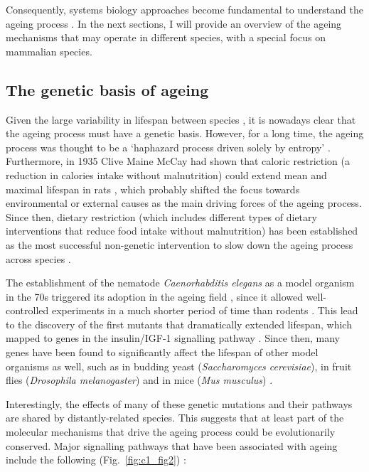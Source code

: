 Consequently, systems biology approaches become fundamental to understand the ageing process \citep{Freund2019}. In the next sections, I will provide an overview of the ageing mechanisms that may operate in different species, with a special focus on mammalian species. 

\smallskip

\subsection{The genetic basis of ageing} \label{s:1.1.2}

\smallskip

Given the large variability in lifespan between species \citep{Jones2013}, it is nowadays clear that the ageing process must have a genetic basis. However, for a long time, the ageing process was thought to be a `haphazard process driven solely by entropy' \citep{Kenyon2005}. Furthermore, in 1935 Clive Maine McCay had shown that caloric restriction (a reduction in calories intake without malnutrition) could extend mean and maximal lifespan in rats \citep{McCay1935,McDonald2010}, which probably shifted the focus towards environmental or external causes as the main driving forces of the ageing process. Since then, dietary restriction (which includes different types of dietary interventions that reduce food intake without malnutrition) has been established as the most successful non-genetic intervention to slow down the ageing process across species \citep{Fontana2015}.

\bigskip

The establishment of the nematode \textit{Caenorhabditis elegans} as a model organism in the 70s triggered its adoption in the ageing field \citep{KLASS1976}, since it allowed well-controlled experiments in a much shorter period of time than rodents \citep{Johnson2013}. This lead to the discovery of the first mutants that dramatically extended lifespan, which mapped to genes in the insulin/IGF-1 signalling pathway \citep{Kenyon1993,Morris1996}. Since then, many genes have been found to significantly affect the lifespan of other model organisms as well, such as in budding yeast (\textit{Saccharomyces cerevisiae}), in fruit flies (\textit{Drosophila melanogaster}) and in mice (\textit{Mus musculus}) \citep{Kenyon2005,Kenyon2010,Singh2019}. 

\bigskip

Interestingly, the effects of many of these genetic mutations and their pathways are shared by distantly-related species. This suggests that at least part of the molecular mechanisms that drive the ageing process could be evolutionarily conserved. Major signalling pathways that have been associated with ageing include the following (Fig.~\ref{fig:c1_fig2}) \citep{Kenyon2005,Kenyon2010,Singh2019,Greer2008}:


